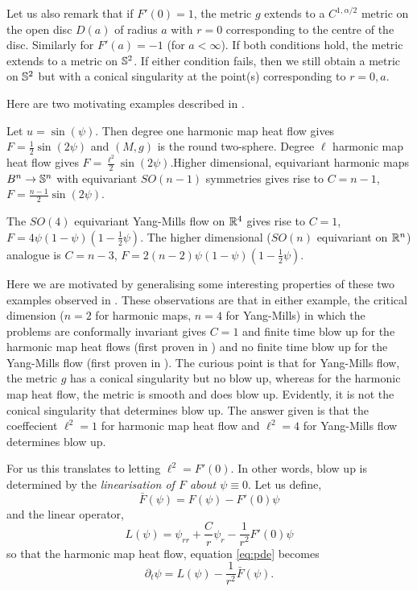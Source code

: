 \documentclass{amsart}
\begin{document}
Let us also remark that if \(F'(0) = 1\), the metric \(g\) extends to a \(C^{1,\alpha/2}\) metric on the open disc \(D(a)\) of radius \(a\) with \(r = 0\) corresponding to the centre of the disc. Similarly for \(F'(a) = -1\) (for \(a < \infty\)). If both conditions hold, the metric extends to a metric on \(\S^2\). If either condition fails, then we still obtain a metric on \(\S^2\) but with a conical singularity at the point(s) corresponding to \(r=0, a\).

Here are two motivating examples described in \cite{MR2332425}.

\begin{example}
Let \(u = \sin(\psi)\). Then degree one harmonic map heat flow gives \(F = \tfrac{1}{2} \sin(2\psi)\) and \((M, g)\) is the round two-sphere. Degree \(\ell\) harmonic map heat flow gives \(F = \tfrac{\ell^2}{2} \sin(2\psi)\).Higher dimensional, equivariant harmonic maps \(B^n \to \S^n\) with equivariant \(SO(n-1)\) symmetries gives rise to \(C = n-1\), \(F = \tfrac{n-1}{2} \sin(2\psi)\).
\end{example}

\begin{example}
The \(SO(4)\) equivariant Yang-Mills flow on \(\R^4\) gives rise to \(C = 1\), \(F = 4 \psi(1 - \psi)(1 - \tfrac{1}{2}\psi)\). The higher dimensional (\(SO(n)\) equivariant on \(\R^n\)) analogue is \(C = n-3\), \(F = 2(n-2) \psi(1-\psi)(1 - \tfrac{1}{2}\psi)\).
\end{example}

Here we are motivated by generalising some interesting properties of these two examples observed in \cite{MR2332425}. These observations are that in either example, the critical dimension (\(n=2\) for harmonic maps, \(n=4\) for Yang-Mills) in which the problems are conformally invariant gives \(C = 1\) and finite time blow up for the harmonic map heat flows (first proven in \cite{MR1180392}) and no finite time blow up for the Yang-Mills flow (first proven in \cite{MR1600272}). The curious point is that for Yang-Mills flow, the metric \(g\) has a conical singularity but no blow up, whereas for the harmonic map heat flow, the metric is smooth and does blow up. Evidently, it is not the conical singularity that determines blow up. The answer given is that the coeffecient \(\ell^2 = 1\) for harmonic map heat flow and \(\ell^2 = 4\) for Yang-Mills flow determines blow up.

For us this translates to letting \(\ell^2 = F'(0)\). In other words, blow up is determined by the \emph{linearisation of \(F\) about \(\psi \equiv 0\)}. Let us define,
\[
\bar{F} (\psi) = F(\psi) - F'(0) \psi
\]
and the linear operator,
\begin{equation}
\label{eq:L}
L(\psi) = \psi_{rr} + \frac{C}{r} \psi_r - \frac{1}{r^2} F'(0) \psi
\end{equation}
so that the harmonic map heat flow, equation \eqref{eq:pde} becomes
\[
\partial_t \psi = L(\psi) - \frac{1}{r^2} \bar{F}(\psi).
\]
\end{document}
